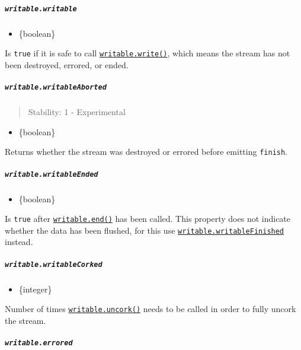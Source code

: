 \subparagraph{\texorpdfstring{\texttt{writable.writable}}{writable.writable}}\label{writable.writable}

\begin{itemize}
\tightlist
\item
  \{boolean\}
\end{itemize}

Is \texttt{true} if it is safe to call
\hyperref[writablewritechunk-encoding-callback]{\texttt{writable.write()}},
which means the stream has not been destroyed, errored, or ended.

\subparagraph{\texorpdfstring{\texttt{writable.writableAborted}}{writable.writableAborted}}\label{writable.writableaborted}

\begin{quote}
Stability: 1 - Experimental
\end{quote}

\begin{itemize}
\tightlist
\item
  \{boolean\}
\end{itemize}

Returns whether the stream was destroyed or errored before emitting
\texttt{\textquotesingle{}finish\textquotesingle{}}.

\subparagraph{\texorpdfstring{\texttt{writable.writableEnded}}{writable.writableEnded}}\label{writable.writableended}

\begin{itemize}
\tightlist
\item
  \{boolean\}
\end{itemize}

Is \texttt{true} after
\hyperref[writableendchunk-encoding-callback]{\texttt{writable.end()}}
has been called. This property does not indicate whether the data has
been flushed, for this use
\hyperref[writablewritablefinished]{\texttt{writable.writableFinished}}
instead.

\subparagraph{\texorpdfstring{\texttt{writable.writableCorked}}{writable.writableCorked}}\label{writable.writablecorked}

\begin{itemize}
\tightlist
\item
  \{integer\}
\end{itemize}

Number of times \hyperref[writableuncork]{\texttt{writable.uncork()}}
needs to be called in order to fully uncork the stream.

\subparagraph{\texorpdfstring{\texttt{writable.errored}}{writable.errored}}\label{writable.errored}

